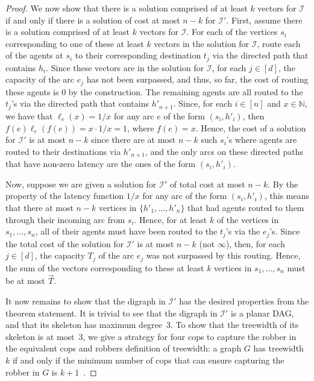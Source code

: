 \documentclass[letterpaper]{article} %
\begin{document}
\begin{proof}
We now show that there is a solution comprised of at least $k$ vectors for $\mathcal{I}$ if and only if there is a solution of cost at most $n-k$ for $\mathcal{I}'$.
First, assume there is a solution comprised of at least $k$ vectors for $\mathcal{I}$.
For each of the vertices $s_i$ corresponding to one of these at least $k$ vectors in the solution for $\mathcal{I}$, route each of the agents at $s_i$ to their corresponding destination $t_j$ via the directed path that contains $h_i$.
Since these vectors are in the solution for $\mathcal{I}$, for each $j\in [d]$, the capacity of the arc $e_j$ has not been surpassed, and thus, so far, the cost of routing these agents is $0$ by the construction.
The remaining agents are all routed to the $t_j$'s via the directed path that contains $h'_{n+1}$.
Since, for each $i\in [n]$ and $x\in \mathbb{N}$, we have that $\ell_e(x) = 1/x$ for any arc $e$ of the form $(s_i,h'_i)$, then $f(e) \ell_e(f(e)) = x \cdot 1/x = 1$, where $f(e) = x$.
Hence, the cost of a solution for $\mathcal{I}'$ is at most $n-k$ since there are at most $n-k$ such $s_i$'s where agents are routed to their destinations via $h'_{n+1}$, and the only arcs on these directed paths that have non-zero latency are the ones of the form $(s_i,h'_i)$.

Now, suppose we are given a solution for $\mathcal{I}'$ of total cost at most $n-k$.
By the property of the latency function $1/x$ for any arc of the form $(s_i,h'_i)$, this means that there at most $n-k$ vertices in $\{h'_1,\ldots,h'_n\}$ that had agents routed to them through their incoming arc from $s_i$.
Hence, for at least $k$ of the vertices in $s_1,\ldots,s_n$, all of their agents must have been routed to the $t_j$'s via the $e_j$'s.
Since the total cost of the solution for $\mathcal{I}'$ is at most $n-k$ (not $\infty$), then, for each $j\in [d]$, the capacity $T_j$ of the arc $e_j$ was not surpassed by this routing.
Hence, the sum of the vectors corresponding to these at least $k$ vertices in $s_1,\ldots,s_n$ must be at most $\vec T$.

It now remains to show that the digraph in $\mathcal{I}'$ has the desired properties from the theorem statement.
It is trivial to see that the digraph in $\mathcal{I}'$ is a planar DAG, and that its skeleton has maximum degree~$3$.
To show that the treewidth of its skeleton is at most~$3$, we give a strategy for four cops to capture the robber in the equivalent cops and robbers definition of treewidth: a graph $G$ has treewidth $k$ if and only if the minimum number of cops that can ensure capturing the robber in $G$ is $k+1$~\cite{SeymourT93}.


\end{proof}
\end{document}
